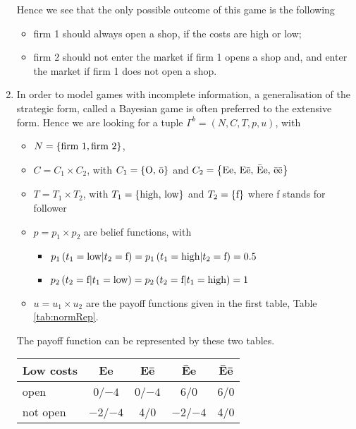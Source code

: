 \begin{enumerate}[label=\alph*.]
	      Hence we see that the only possible outcome of this game is the following
	      \begin{itemize}
	      	\item firm 1 should always open a shop, if the costs are high or low;
	      	\item firm 2 should not enter the market if firm 1 opens a shop and, and enter the market if firm 1 does not open a shop.
	      \end{itemize}

	\item In order to model games with incomplete information, a generalisation of the strategic form, called a Bayesian game is often preferred to the extensive form. Hence we are looking for a tuple $\Gamma^b = (N,C,T,p,u)$, with
	      \begin{itemize}
	      	\item $N = \left\{\text{firm 1}, \text{firm 2}\right\}$,
	      	\item $C = C_1 \times C_2$, with $C_1 = \left\{\text{O, \=o}\right\}$ and $C_2 = \left\{\text{Ee, E\=e, \=Ee, \=e\=e}\right\}$
	      	\item $T = T_1 \times T_2$, with $T_1 = \left\{\text{high, low}\right\}$ and $T_2 = \left\{\text{f}\right\}$ where f stands for follower
	      	\item $p = p_1 \times p_2$ are belief functions, with
	      	      \begin{itemize}
	      	      	\item $p_1 \left(t_1 = \text{low} | t_2 = \text{f}\right) = p_1 \left(t_1 = \text{high} | t_2 = \text{f}\right) = 0.5 $
	      	      	\item $p_2 \left( t_2 = \text{f} | t_1 = \text{low}\right) = p_2 \left( t_2 = \text{f} | t_1 = \text{high}\right) = 1 $
	      	      \end{itemize}
	      	\item $u = u_1 \times u_2$ are the payoff functions given in the first table, Table \ref{tab:normRep}.

	      \end{itemize}

				The payoff function can be represented by these two tables.

			 \begin{center}
				 \begin{tabular}{l|cccc}
              Low costs & Ee & E\=e & \=Ee & \=E\=e \\
					 		\hline
              open        & 0/$-4$ & 0/$-4$ & 6/0 & 6/0 \\
              not open    & $-2$/$-4$ & 4/0 & $-2$/$-4$ & 4/0\\
				 \end{tabular}


\end{center}
\end{enumerate}
